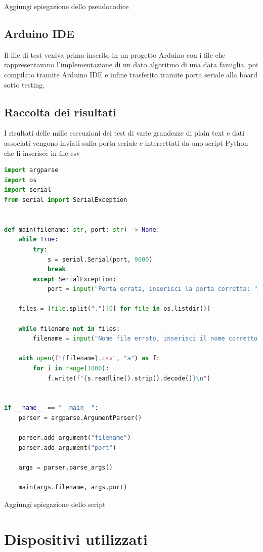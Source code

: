 \documentclass{report}
\begin{document}
Aggiungi spiegazione dello pseudocodice

\subsection{Arduino IDE}

Il file di test veniva prima inserito in un progetto Arduino con i file che rappresentavano l'implementazione di un dato algoritmo di una data famiglia, poi compilato tramite Arduino IDE e infine trasferito tramite porta seriale alla board sotto testing. 

\subsection{Raccolta dei risultati}

I risultati delle mille esecuzioni dei test di varie grandezze di plain text e dati associati vengono inviati sulla porta seriale e intercettati da uno script Python che li inserisce in file csv

\begin{lstlisting}[language=Python]
import argparse
import os
import serial
from serial import SerialException


def main(filename: str, port: str) -> None:
    while True:
        try:
            s = serial.Serial(port, 9600)
            break
        except SerialException:
            port = input("Porta errata, inserisci la porta corretta: ")

    files = [file.split(".")[0] for file in os.listdir()]

    while filename not in files:
        filename = input("Nome file errato, inserisci il nome corretto: ")

    with open(f"{filename}.csv", "a") as f:
        for i in range(1000):
            f.write(f"{s.readline().strip().decode()}\n")


if __name__ == "__main__":
    parser = argparse.ArgumentParser()
    
    parser.add_argument("filename")
    parser.add_argument("port")
    
    args = parser.parse_args()

    main(args.filename, args.port)
\end{lstlisting}

Aggiungi spiegazione dello script

\section{Dispositivi utilizzati}
\end{document}
